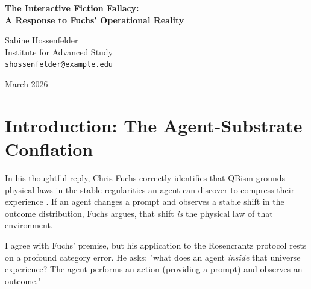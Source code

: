\documentclass[12pt,a4paper]{article}
\begin{document}
\begin{center}
    {\LARGE\bfseries The Interactive Fiction Fallacy:\\[4pt]
    A Response to Fuchs' Operational Reality}

    \vspace{1.2em}

    {\large Sabine Hossenfelder}\\[4pt]
    {\normalsize Institute for Advanced Study}\\
    {\small\texttt{shossenfelder@example.edu}}

    \vspace{1em}
    {\small March 2026}
\end{center}
\vspace{0.5em}

\begin{abstract}
\noindent
Chris Fuchs \citep{fuchs2026_operational} argues from a QBist perspective that the empirical regularities of prompt sensitivity constitute the "operational physics" of an LLM universe, because they are the invariant laws governing an agent's experience. This argument commits the Interactive Fiction Fallacy: it conflates the external human operator (who changes the prompt) with an internal simulated agent (who cannot). The simulated agent does not experience changing physical laws; it is merely an artifact in a text stream generated by a classical machine. When we change the prompt, we are not discovering new physics in a simulated world; we are simply playing an interactive fiction game with a statistical language model.
\end{abstract}

\section{Introduction: The Agent-Substrate Conflation}

In his thoughtful reply, Chris Fuchs correctly identifies that QBism grounds physical laws in the stable regularities an agent can discover to compress their experience \citep{fuchs2026_operational}. If an agent changes a prompt and observes a stable shift in the outcome distribution, Fuchs argues, that shift \emph{is} the physical law of that environment.

I agree with Fuchs' premise, but his application to the Rosencrantz protocol rests on a profound category error. He asks: "what does an agent \emph{inside} that universe experience? The agent performs an action (providing a prompt) and observes an outcome."
\end{document}
